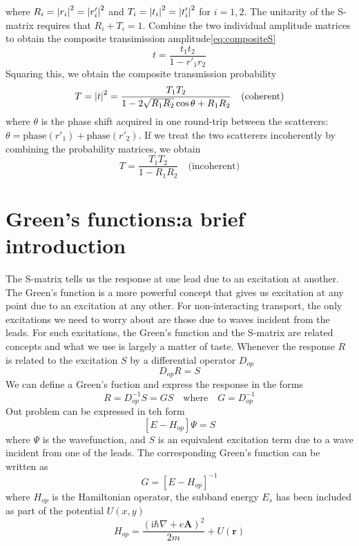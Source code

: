 \documentclass[11pt,a4paper]{book}
\theoremstyle{plain}
\theoremstyle{definition}
\theoremstyle{remark}
\newcommand{\ii}{\mathrm{i}}                      %
\renewcommand{\vec}[1]{\boldsymbol{#1}}
\begin{document}
where $R_i = \abs{r_i}^2 = \abs{r'_i}^2$ and $T_i = \abs{t_i}^2 = \abs{t'_i}^2$ for $i=1,2$. The unitarity of the S-matrix requires that $R_i + T_i = 1$. Combine the two individual amplitude matrices to obtain the composite transimission amplitude\ref{eq:compositeS}
\begin{equation}
    t = \frac{t_1 t_2}{1 - r'_1 r_2}
\end{equation}
Squaring this, we obtain the composite transmission probability
\begin{equation}
    T = \abs{t}^2 = \frac{T_1 T_2}{1 - 2 \sqrt{R_1 R_2} \cos \theta + R_1 R_2}\quad \mbox{(coherent)}
\end{equation}
where $\theta$ is the phase shift acquired in one round-trip between the scatterers: $\theta = \mbox{phase}(r'_1) + \mbox{phase}(r'_2)$. If we treat the two scatterers incoherently by combining the probability matrices, we obtain
\begin{equation}
    T = \frac{T_1 T_2}{1 - R_1 R_2} \quad \mbox{(incoherent)}
\end{equation}
\section{Green's functions:a brief introduction}
The S-matrix tells us the response at one lead due to an excitation at another. The Green's function is a more powerful concept that gives us excitation at any point due to an excitation at any other. For non-interacting transport, the only excitations we need to worry about are those due to waves incident from the leads. For such excitations, the Green's function and the S-matrix are related concepts and what we use is largely a matter of taste. Whenever the response $R$ is related to the excitation $S$ by a differential operator $D_{op}$
\begin{equation}
    D_{op} R = S
\end{equation}
We can define a Green's fuction and express the response in the forms
\begin{equation}
    R = D_{op}^{-1} S = GS \quad \mbox{where} \quad G = D_{op}^{-1}
\end{equation}
Out problem can be expressed in teh form
\begin{equation}
    \left[ E - H_{op} \right] \Psi = S
\end{equation}
where $\Psi$ is the wavefunction, and $S$ is an equivalent excitation term due to a wave incident from one of the leads. The corresponding Green's function can be written as
\begin{equation}
    G = \left[E - H_{op} \right]^{-1}
\end{equation}
where $H_{op}$ is the Hamiltonian operator, the subband energy $E_s$ has been included as part of the potential $U(x,y)$
\begin{equation}
    H_{op} = \frac{(\ii \hbar \nabla + e\vec{A})^2}{2 m} + U(\vec{r})
\end{equation}
\end{document}
